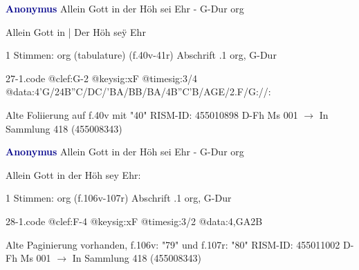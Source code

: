 \documentclass[twocolumn]{book}
\begin{document}
\newline \par \vspace{7pt} \textcolor{darkblue}{\textbf{Anonymus  }}
\newline Allein Gott in der Höh sei Ehr - G-Dur
\newline org
\newline \begin{itshape}[f.40v, at left:] Allein Gott in | Der Höh seÿ Ehr\end{itshape} 
\newline \textcolor{darkblue}{}  1 Stimmen: org (tabulature)  (f.40v-41r)
\newline Abschrift
.1  org, G-Dur  
\begin{filecontents*}{27-1.code}
@clef:G-2
@keysig:xF
@timesig:3/4
@data:4'G/24B''C/DC/'BA/BB/BA/4B''C'B/AGE/2.F/G://:
\end{filecontents*}
\newline
%
\newline Alte Foliierung auf f.40v mit "40"
\newline RISM-ID: 455010898
\newline D-Fh  Ms 001
\newline $\rightarrow$ In Sammlung 418 (455008343)
      
\newline \par \vspace{7pt} \textcolor{darkblue}{\textbf{Anonymus  }}
\newline Allein Gott in der Höh sei Ehr - G-Dur
\newline org
\newline \begin{itshape}[f.106v, heading:] Allein Gott in der Höh sey Ehr:\end{itshape} 
\newline \textcolor{darkblue}{}  1 Stimmen: org  (f.106v-107r)
\newline Abschrift
.1  org, G-Dur  
\begin{filecontents*}{28-1.code}
@clef:F-4
@keysig:xF
@timesig:3/2
@data:4,GA2B%
\end{filecontents*}
\newline
%
\newline Alte Paginierung vorhanden, f.106v: "79" und f.107r: "80"
\newline RISM-ID: 455011002
\newline D-Fh  Ms 001
\newline $\rightarrow$ In Sammlung 418 (455008343)
      
\end{document}
